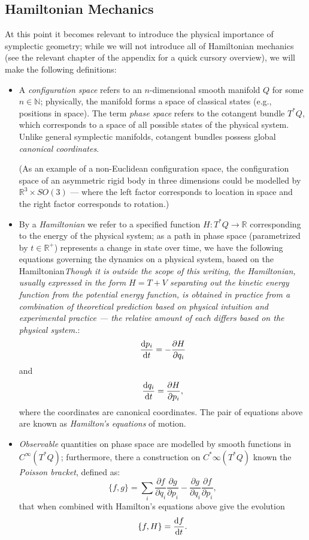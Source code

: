 \subsection{Hamiltonian Mechanics}
At this point it becomes relevant to introduce the physical importance of symplectic geometry; while we will not introduce all of Hamiltonian mechanics (see the relevant chapter of the appendix for a quick cursory overview), we will make the following definitions:
\begin{defn}
\begin{itemize}
\item A \emph{configuration space} refers to an $n$-dimensional smooth manifold $Q$ for some $n \in \mathbb{N}$; physically, the manifold forms a space of classical states (e.g., positions in space). The term \emph{phase space} refers to the cotangent bundle $T^*Q$, which corresponds to a space of all possible states of the physical system. Unlike general symplectic manifolds, cotangent bundles possess global \emph{canonical coordinates}.

(As an example of a non-Euclidean configuration space, the configuration space of an asymmetric rigid body in three dimensions could be modelled by $\mathbb{R}^3 \times SO(3)$ --- where the left factor corresponds to location in space and the right factor corresponds to rotation.)

\item By a \emph{Hamiltonian} we refer to a specified function $H: T^*Q \to \mathbb{R}$ corresponding to the energy of the physical system; as a path in phase space (parametrized by $t \in \mathbb{R}^+$) represents a change in state over time, we have the following equations governing the dynamics on a physical system, based on the Hamiltonian\emph{Though it is outside the scope of this writing, the Hamiltonian, usually expressed in the form $H = T + V$ separating out the kinetic energy function from the potential energy function, is obtained in practice from a combination of theoretical prediction based on physical intuition and experimental practice --- the relative amount of each differs based on the physical system.}:
$$
\frac{\mathrm{d} p_i}{\mathrm{d} t} = -\frac{\partial H}{\partial q_i}
$$
and
$$
\frac{\mathrm{d} q_i}{\mathrm{d} t} = \frac{\partial H}{\partial p_i},
$$
where the coordinates are canonical coordinates. The pair of equations above are known as \emph{Hamilton's equations} of motion.

\item \emph{Observable} quantities on phase space are modelled by smooth functions in $C^\infty(T^*Q)$; furthermore, there a construction on $C^*\infty(T^*Q)$ known the \emph{Poisson bracket}, defined as:
$$
\{f,g\} = \sum_i \frac{\partial f}{\partial q_i}\frac{\partial g}{\partial p_i} - \frac{\partial g}{\partial q_i}\frac{\partial f}{\partial p_i},
$$
that when combined with Hamilton's equations above give the evolution
$$
\{f,H\} = \frac{\mathrm{d} f}{\mathrm{d} t}.
$$

\end{itemize}
\end{defn}

